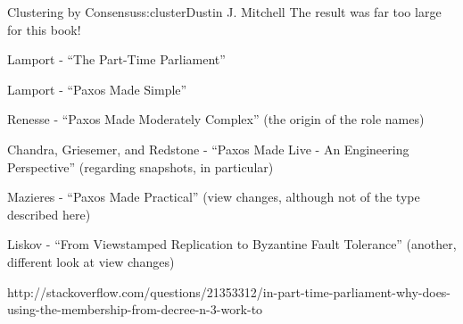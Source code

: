 \begin{aosachapter}{Clustering by Consensus}{s:cluster}{Dustin J. Mitchell}
The result was far too large for this book!

\label{references}

\begin{aosaitemize}

\item
  Lamport - ``The Part-Time Parliament''
\item
  Lamport - ``Paxos Made Simple''
\item
  Renesse - ``Paxos Made Moderately Complex'' (the origin of the role
  names)
\item
  Chandra, Griesemer, and Redstone - ``Paxos Made Live - An Engineering
  Perspective'' (regarding snapshots, in particular)
\item
  Mazieres - ``Paxos Made Practical'' (view changes, although not of the
  type described here)
\item
  Liskov - ``From Viewstamped Replication to Byzantine Fault Tolerance''
  (another, different look at view changes)
\item
  http://stackoverflow.com/questions/21353312/in-part-time-parliament-why-does-using-the-membership-from-decree-n-3-work-to
\end{aosaitemize}

\end{aosachapter}
